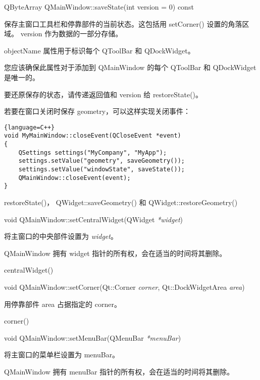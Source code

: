\splitLine

QByteArray QMainWindow::saveState(int version = 0) const

保存主窗口工具栏和停靠部件的当前状态。这包括用 setCorner() 设置的角落区域。
version 作为数据的一部分存储。

objectName 属性用于标识每个 QToolBar 和 QDockWidget。

您应该确保此属性对于添加到 QMainWindow 的每个 QToolBar 和 QDockWidget 是唯一的。

要还原保存的状态，请传递返回值和 version 给 restoreState()。

若要在窗口关闭时保存 geometry，可以这样实现关闭事件：

\begin{lstlisting}{language=C++}
void MyMainWindow::closeEvent(QCloseEvent *event)
{
    QSettings settings("MyCompany", "MyApp");
    settings.setValue("geometry", saveGeometry());
    settings.setValue("windowState", saveState());
    QMainWindow::closeEvent(event);
}
\end{lstlisting}

\begin{seeAlso}
restoreState()， QWidget::saveGeometry() 和 QWidget::restoreGeometry()
\end{seeAlso}

\splitLine

void QMainWindow::setCentralWidget(QWidget \emph{*widget})

将主窗口的中央部件设置为 \emph{widget}。

\begin{notice}
QMainWindow 拥有 widget 指针的所有权，会在适当的时间将其删除。
\end{notice}

\begin{seeAlso}
centralWidget()
\end{seeAlso}

\splitLine

void QMainWindow::setCorner(Qt::Corner \emph{corner}, Qt::DockWidgetArea \emph{area})

用停靠部件 area 占据指定的 corner。

\begin{seeAlso}
corner()
 \end{seeAlso}

\splitLine

void QMainWindow::setMenuBar(QMenuBar \emph{*menuBar})

将主窗口的菜单栏设置为 menuBar。

\begin{notice}
QMainWindow 拥有 menuBar 指针的所有权，会在适当的时间将其删除。\end{notice}

